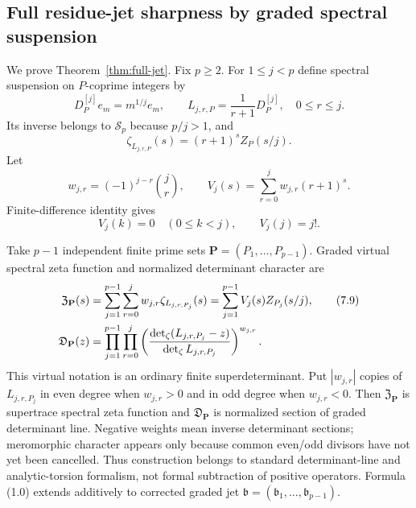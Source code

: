 \documentclass[11pt]{article}
\theoremstyle{definition}
\theoremstyle{remark}
\begin{document}
\subsection{Full residue-jet sharpness by graded spectral suspension}

We prove Theorem~\ref{thm:full-jet}.  Fix $p\geq2$.  For $1\leq j<p$ define spectral
suspension on $P$-coprime integers by
\[
 D_P^{[j]}e_m=m^{1/j}e_m,\qquad
 L_{j,r,P}=\frac1{r+1}D_P^{[j]},\quad 0\leq r\leq j.
\]
Its inverse belongs to $\mathcal S_p$ because $p/j>1$, and
\[
 \zeta_{L_{j,r,P}}(s)=(r+1)^s Z_P(s/j).
\]
Let
\begin{equation}
 w_{j,r}=(-1)^{j-r}\binom jr,\qquad
 V_j(s)=\sum_{r=0}^j w_{j,r}(r+1)^s.                    \tag{7.7}
\end{equation}
Finite-difference identity gives
\begin{equation}
 V_j(k)=0\quad(0\leq k<j),\qquad V_j(j)=j!.             \tag{7.8}
\end{equation}

Take $p-1$ independent finite prime sets $\mathbf P=(P_1,\ldots,P_{p-1})$.  Graded virtual
spectral zeta function and normalized determinant character are
\begin{align}
 \mathfrak Z_{\mathbf P}(s)
   &=\sum_{j=1}^{p-1}\sum_{r=0}^j w_{j,r}\zeta_{L_{j,r,P_j}}(s)
     =\sum_{j=1}^{p-1}V_j(s)Z_{P_j}(s/j),                \tag{7.9}\\
 \mathfrak D_{\mathbf P}(z)
   &=\prod_{j=1}^{p-1}\prod_{r=0}^j
     \left(\frac{\det_\zeta(L_{j,r,P_j}-z)}
                  {\det_\zeta L_{j,r,P_j}}\right)^{w_{j,r}}. \notag
\end{align}
This virtual notation is an ordinary finite superdeterminant.  Put $|w_{j,r}|$ copies of
$L_{j,r,P_j}$ in even degree when $w_{j,r}>0$ and in odd degree when $w_{j,r}<0$.  Then
$\mathfrak Z_{\mathbf P}$ is supertrace spectral zeta function and
$\mathfrak D_{\mathbf P}$ is normalized section of graded determinant line.  Negative weights
mean inverse determinant sections; meromorphic character appears only because common even/odd
divisors have not yet been cancelled.  Thus construction belongs to standard determinant-line
and analytic-torsion formalism, not formal subtraction of positive operators.  Formula (1.0)
extends additively to corrected graded jet
$\mathfrak b=(\mathfrak b_1,\ldots,\mathfrak b_{p-1})$.
\end{document}
